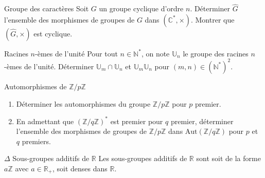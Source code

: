 \documentclass[french,a4paper]{article}
\newcommand{\N}{\mathbb{N}}
\newcommand{\Z}{\mathbb{Z}}
\newcommand{\R}{\mathbb{R}}
\newcommand{\C}{\mathbb{C}}
\newcommand{\U}{\mathbb{U}}
\newcommand{\st}{^*}
\theoremstyle{plain}
\theoremstyle{definition}
\theoremstyle{remark}
\begin{document}
\begin{ex}[Moulin.06]{Groupe des caractères}
	Soit $G$ un groupe cyclique d'ordre $n$. Déterminer $\hat{G}$ l'ensemble des morphismes de groupes de $G$ dans $(\C\st,\times)$. Montrer que $(\hat{G},\times)$ est cyclique.
\end{ex}

\begin{ex}[Moulin.07]{Racines $n$-èmes de l'unité}
	Pour tout $n\in\N\st$, on note $\U_n$ le groupe des racines $n$-èmes de l'unité. Déterminer $\U_m\cap\U_n$ et $\U_m\U_n$ pour $(m,n)\in(\N\st)^2$.
\end{ex}

\begin{ex}[Moulin.08]{Automorphismes de $\Z/p\Z$}
	\begin{enumerate}
		\item Déterminer les automorphismes du groupe $\Z/p\Z$ pour $p$ premier.
		\item En admettant que $(\Z/q\Z)\st$ est premier pour $q$ premier, déterminer l'ensemble des morphismes de groupes de $\Z/p\Z$ dans $\text{Aut}(\Z/q\Z)$ pour $p$ et $q$ premiers.
	\end{enumerate}
\end{ex}

\begin{ex}[Moulin.09]{$\Delta$ Sous-groupes additifs de $\R$}
	Les sous-groupes additifs de $\R$ sont soit de la forme $a\Z$ avec $a\in\R_+$, soit denses dans $\R$.
\end{ex}
\end{document}
